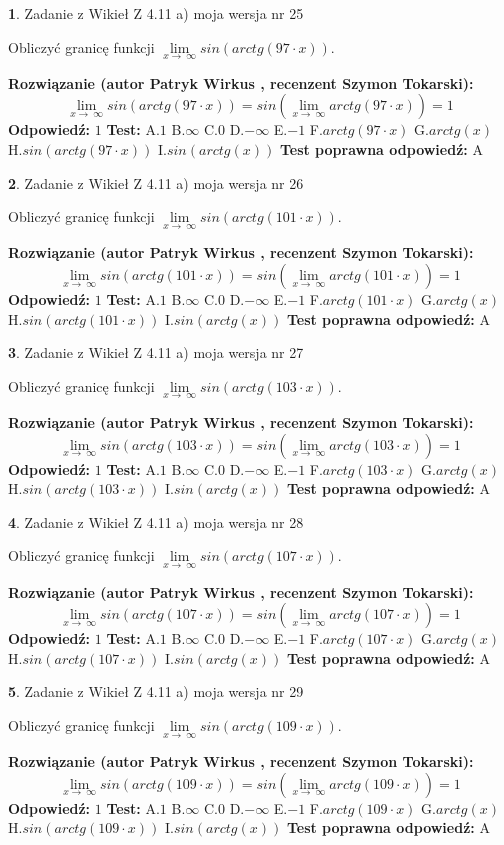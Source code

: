 \documentclass[12pt, a4paper]{article}
\theoremstyle{definition} %
\newtheorem{zad}{}
\newcommand{\zadStart}[1]{\begin{zad}#1\newline}
\newcommand{\zadStop}{\end{zad}}
\newcommand{\rozwStart}[2]{\noindent \textbf{Rozwiązanie (autor #1 , recenzent #2): }\newline}
\newcommand{\rozwStop}{\newline}
\newcommand{\odpStart}{\noindent \textbf{Odpowiedź:}\newline}
\newcommand{\odpStop}{\newline}
\newcommand{\testStart}{\noindent \textbf{Test:}\newline}
\newcommand{\testStop}{\newline}
\newcommand{\kluczStart}{\noindent \textbf{Test poprawna odpowiedź:}\newline}
\newcommand{\kluczStop}{\newline}
\begin{document}
\zadStart{Zadanie z Wikieł Z 4.11 a) moja wersja nr 25}

Obliczyć granicę funkcji  $\lim\limits_{x\to\ \infty}sin(arctg(97\cdot x))$.
\zadStop
\rozwStart{Patryk Wirkus}{Szymon Tokarski}
$$\lim\limits_{x\to\ \infty}sin(arctg(97\cdot x)) = sin(\lim\limits_{x\to\ \infty}arctg(97\cdot x)) = 1$$
\rozwStop
\odpStart
$1$
\odpStop
\testStart
A.$1$ B.$\infty$ C.$0$ D.$-\infty$ E.$-1$
F.$arctg(97\cdot x)$ G.$arctg(x)$
H.$sin(arctg(97\cdot x))$
I.$sin(arctg(x))$
\testStop
\kluczStart
A
\kluczStop



\zadStart{Zadanie z Wikieł Z 4.11 a) moja wersja nr 26}

Obliczyć granicę funkcji  $\lim\limits_{x\to\ \infty}sin(arctg(101\cdot x))$.
\zadStop
\rozwStart{Patryk Wirkus}{Szymon Tokarski}
$$\lim\limits_{x\to\ \infty}sin(arctg(101\cdot x)) = sin(\lim\limits_{x\to\ \infty}arctg(101\cdot x)) = 1$$
\rozwStop
\odpStart
$1$
\odpStop
\testStart
A.$1$ B.$\infty$ C.$0$ D.$-\infty$ E.$-1$
F.$arctg(101\cdot x)$ G.$arctg(x)$
H.$sin(arctg(101\cdot x))$
I.$sin(arctg(x))$
\testStop
\kluczStart
A
\kluczStop



\zadStart{Zadanie z Wikieł Z 4.11 a) moja wersja nr 27}

Obliczyć granicę funkcji  $\lim\limits_{x\to\ \infty}sin(arctg(103\cdot x))$.
\zadStop
\rozwStart{Patryk Wirkus}{Szymon Tokarski}
$$\lim\limits_{x\to\ \infty}sin(arctg(103\cdot x)) = sin(\lim\limits_{x\to\ \infty}arctg(103\cdot x)) = 1$$
\rozwStop
\odpStart
$1$
\odpStop
\testStart
A.$1$ B.$\infty$ C.$0$ D.$-\infty$ E.$-1$
F.$arctg(103\cdot x)$ G.$arctg(x)$
H.$sin(arctg(103\cdot x))$
I.$sin(arctg(x))$
\testStop
\kluczStart
A
\kluczStop



\zadStart{Zadanie z Wikieł Z 4.11 a) moja wersja nr 28}

Obliczyć granicę funkcji  $\lim\limits_{x\to\ \infty}sin(arctg(107\cdot x))$.
\zadStop
\rozwStart{Patryk Wirkus}{Szymon Tokarski}
$$\lim\limits_{x\to\ \infty}sin(arctg(107\cdot x)) = sin(\lim\limits_{x\to\ \infty}arctg(107\cdot x)) = 1$$
\rozwStop
\odpStart
$1$
\odpStop
\testStart
A.$1$ B.$\infty$ C.$0$ D.$-\infty$ E.$-1$
F.$arctg(107\cdot x)$ G.$arctg(x)$
H.$sin(arctg(107\cdot x))$
I.$sin(arctg(x))$
\testStop
\kluczStart
A
\kluczStop



\zadStart{Zadanie z Wikieł Z 4.11 a) moja wersja nr 29}

Obliczyć granicę funkcji  $\lim\limits_{x\to\ \infty}sin(arctg(109\cdot x))$.
\zadStop
\rozwStart{Patryk Wirkus}{Szymon Tokarski}
$$\lim\limits_{x\to\ \infty}sin(arctg(109\cdot x)) = sin(\lim\limits_{x\to\ \infty}arctg(109\cdot x)) = 1$$
\rozwStop
\odpStart
$1$
\odpStop
\testStart
A.$1$ B.$\infty$ C.$0$ D.$-\infty$ E.$-1$
F.$arctg(109\cdot x)$ G.$arctg(x)$
H.$sin(arctg(109\cdot x))$
I.$sin(arctg(x))$
\testStop
\kluczStart
A
\kluczStop
\end{document}
